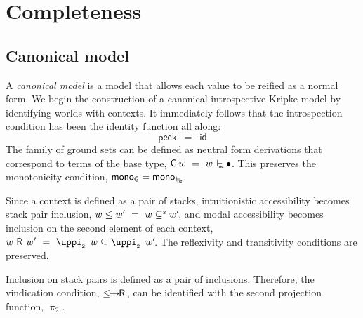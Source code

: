 \documentclass[submission,copyright,creativecommons,sharealike,backref=page]{eptcs}
\renewcommand{\leq}{\mathrel{\subseteq}}
\newcommand{\leqII}{\mathrel{\subseteq^{\scriptscriptstyle{2}}}}
\newcommand{\R}{\mathrel{\rlap{$\mkern.75mu\textsf{R}$}\hphantom{\subseteq}}}
\renewcommand{\:}{\mathop{\mkern3mu:\mkern3mu}}
\renewcommand{\.}{\mathop{\mkern3mu.\mkern3mu}}
\renewcommand{\;}{\mathop{;}}
\renewcommand{\,}{\mathop{,}}
\newcommand{\id}{\operatorname{\textsf{id}}}
\newcommand{\ene}{\mathrel{\mkern2mu\vdash_{\mkern-9mu\rlap{$\scriptscriptstyle{\textsf{ne}}$}\hphantom{\scriptscriptstyle{\textsf{nf}}}}}}
\renewcommand{\r}{\mathrel{\rightarrow\mkern-1mu}}
\newcommand{\monoene}{\operatorname{\textsf{mono}_{\ene}}}
\newcommand{\peek}{\operatorname{\textsf{peek}}}
\newcommand{\piii}{\operatorname{\uppi_{\scriptscriptstyle{2}}}}
\newcommand{\lerR}{\operatorname{\le\mkern-1mu\r\mkern-1mu\R}}
\newcommand{\G}{\operatorname{\textsf{G}}}
\newcommand{\monoG}{\operatorname{\textsf{mono}_{\G}}}
\newcommand{\base}{\mathop{\bullet}}
\theoremstyle{mystyle}
\begin{document}
\section{Completeness}\label{Completeness}

\subsection{Canonical model}

A \emph{canonical model} is a model that allows each value to be reified as a normal form.  We begin the construction of a canonical introspective Kripke model by identifying worlds with contexts.  It immediately follows that the introspection condition has been the identity function all along:
$$
\peek ~=~ \id
$$
The family of ground sets can be defined as neutral form derivations that correspond to terms of the base type, $\G w ~=~ w \ene \base$.  This preserves the monotonicity condition, $\monoG = \monoene$.

Since a context is defined as a pair of stacks, intuitionistic accessibility becomes stack pair inclusion, $w \le w' ~=~ w \leqII w'\mkern-3mu$, and modal accessibility becomes inclusion on the second element of each context, $w \R w' ~=~ \piii~w \leq \piii~w'\mkern-3mu$.  The reflexivity and transitivity conditions are preserved.

Inclusion on stack pairs is defined as a pair of inclusions.  Therefore, the vindication condition, $\lerR$, can be identified with the second projection function, $\piii$.
\end{document}
